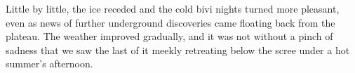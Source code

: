 Little by little, the ice receded and the cold bivi nights turned more pleasant, even as news of further underground discoveries came floating back from the plateau. The weather improved gradually, and it was not without a pinch of sadness that we saw the last of it meekly retreating below the scree under a hot summer's afternoon. 


\begin{pagefigure}
\checkoddpage \ifoddpage \forcerectofloat \else \forceversofloat \fi
   \centering

       \begin{subfigure}[t]{0.393\textwidth}
        \centering
        \caption{} \label{Snow plug}
    \end{subfigure}
    \hfill
     \begin{subfigure}[t]{0.59\textwidth}
        \centering
        \caption{} \label{Snow sawing}
    \end{subfigure}
    

\end{pagefigure}
